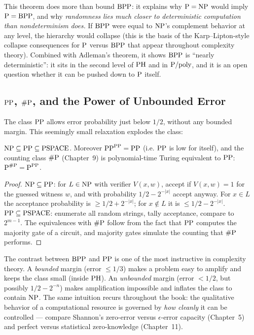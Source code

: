 This theorem does more than bound $\text{BPP}$: it explains why $\text{P} = \text{NP}$ would imply $\text{P} = \text{BPP}$, and why \emph{randomness lies much closer to deterministic computation than nondeterminism does.} If $\text{BPP}$ were equal to $\text{NP}$'s complement behavior at any level, the hierarchy would collapse (this is the basis of the Karp--Lipton-style collapse consequences for $\text{P}$ versus $\text{BPP}$ that appear throughout complexity theory). Combined with Adleman's theorem, it shows $\text{BPP}$ is ``nearly deterministic'': it sits in the second level of $\text{PH}$ and in $\text{P}/\text{poly}$, and it is an open question whether it can be pushed down to $\text{P}$ itself.

\subsection{$\text{PP}$, $\#\text{P}$, and the Power of Unbounded Error}
\label{sec:randomized:pp}

The class $\text{PP}$ allows error probability just below $1/2$, without any bounded margin. This seemingly small relaxation explodes the class:

\begin{theorem}
$\text{NP} \subseteq \text{PP} \subseteq \text{PSPACE}$. Moreover $\text{PP}^{\text{PP}} = \text{PP}$ (i.e. $\text{PP}$ is low for itself), and the counting class $\#\text{P}$ (Chapter~9) is polynomial-time Turing equivalent to $\text{PP}$: $\text{P}^{\#\text{P}} = \text{P}^{\text{PP}}$.
\end{theorem}

\begin{proof}
$\text{NP} \subseteq \text{PP}$: for $L \in \text{NP}$ with verifier $V(x, w)$, accept if $V(x,w) = 1$ for the guessed witness $w$, and with probability $1/2 - 2^{-|x|}$ accept anyway. For $x \in L$ the acceptance probability is $\ge 1/2 + 2^{-|x|}$; for $x \notin L$ it is $\le 1/2 - 2^{-|x|}$. $\text{PP} \subseteq \text{PSPACE}$: enumerate all random strings, tally acceptance, compare to $2^{m-1}$. The equivalences with $\#\text{P}$ follow from the fact that $\text{PP}$ computes the majority gate of a circuit, and majority gates simulate the counting that $\#\text{P}$ performs.
\end{proof}

The contrast between $\text{BPP}$ and $\text{PP}$ is one of the most instructive in complexity theory. A \emph{bounded} margin (error $\le 1/3$) makes a problem easy to amplify and keeps the class small (inside $\text{PH}$). An \emph{unbounded} margin (error $< 1/2$, but possibly $1/2 - 2^{-n}$) makes amplification impossible and inflates the class to contain $\text{NP}$. The same intuition recurs throughout the book: the qualitative behavior of a computational resource is governed by \emph{how cleanly} it can be controlled --- compare Shannon's zero-error versus $\epsilon$-error capacity (Chapter~5) and perfect versus statistical zero-knowledge (Chapter~11).

